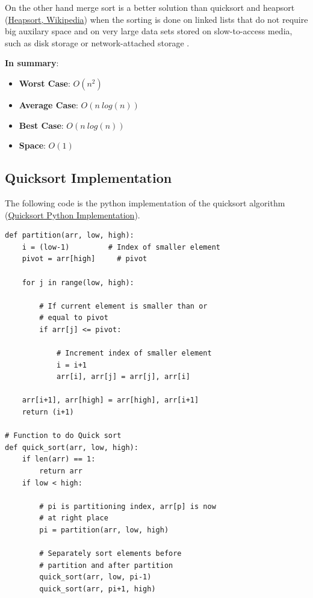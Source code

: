 On the other hand merge sort is a better solution than quicksort and heapsort \cite{wikiheapsort} (\href{https://en.wikipedia.org/wiki/Heapsort}{Heapsort, Wikipedia}) when the sorting is done on linked lists that do not require big auxilary space and on very large data sets stored on slow-to-access media, such as disk storage or network-attached storage \cite{wikiqicksort}.

\textbf{In summary}:
\begin{itemize}
\item \textbf{Worst Case}: \(O(n^{2})\)
\item \textbf{Average Case}: \(O(n\ log(n))\)
\item \textbf{Best Case}: \(O(n\ log(n))\)
\item \textbf{Space}: \(O(1)\)
\end{itemize}

\subsection{Quicksort Implementation}
The following code is the python implementation of the quicksort algorithm \cite{quicksortcode} (\href{https://www.geeksforgeeks.org/python-program-for-quicksort/}{Quicksort Python Implementation}).
\begin{lstlisting}[firstnumber=1, caption={Quicksort python implementation.}]
def partition(arr, low, high): 
    i = (low-1)         # Index of smaller element 
    pivot = arr[high]     # pivot 
  
    for j in range(low, high): 
  
        # If current element is smaller than or 
        # equal to pivot 
        if arr[j] <= pivot: 
  
            # Increment index of smaller element 
            i = i+1
            arr[i], arr[j] = arr[j], arr[i] 
  
    arr[i+1], arr[high] = arr[high], arr[i+1] 
    return (i+1) 
    
# Function to do Quick sort   
def quick_sort(arr, low, high): 
    if len(arr) == 1: 
        return arr 
    if low < high: 
  
        # pi is partitioning index, arr[p] is now 
        # at right place 
        pi = partition(arr, low, high) 
  
        # Separately sort elements before 
        # partition and after partition 
        quick_sort(arr, low, pi-1) 
        quick_sort(arr, pi+1, high)
    
\end{lstlisting}

